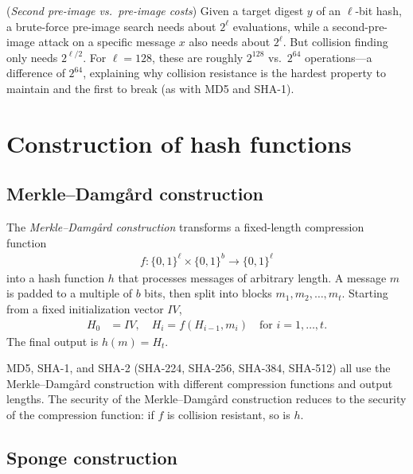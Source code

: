 \documentclass[a4paper, 12pt]{book} %
\begin{document}
\begin{example}
    (\emph{Second pre-image vs.\ pre-image costs}) Given a target digest $y$ of an $\ell$-bit hash, a brute-force pre-image search needs about $2^\ell$ evaluations, while a second-pre-image attack on a specific message $x$ also needs about $2^\ell$. But collision finding only needs $2^{\ell/2}$. For $\ell = 128$, these are roughly $2^{128}$ vs.\ $2^{64}$ operations---a difference of $2^{64}$, explaining why collision resistance is the hardest property to maintain and the first to break (as with MD5 and SHA-1).
\end{example}

\section{Construction of hash functions}

\subsection{Merkle--Damg\aa rd construction}

\begin{definition}
    The \emph{Merkle--Damg\aa rd construction} transforms a fixed-length compression function
    \begin{align}
        f: \{0,1\}^\ell \times \{0,1\}^b \longrightarrow \{0,1\}^\ell
    \end{align}
    into a hash function $h$ that processes messages of arbitrary length. A message $m$ is padded to a multiple of $b$ bits, then split into blocks $m_1, m_2, \ldots, m_t$. Starting from a fixed initialization vector $IV$,
    \begin{align}
        H_0 &= IV, \quad H_i = f(H_{i-1}, m_i) \quad \text{for } i = 1, \ldots, t.
    \end{align}
    The final output is $h(m) = H_t$.
\end{definition}

MD5, SHA-1, and SHA-2 (SHA-224, SHA-256, SHA-384, SHA-512) all use the Merkle--Damg\aa rd construction with different compression functions and output lengths. The security of the Merkle--Damg\aa rd construction reduces to the security of the compression function: if $f$ is collision resistant, so is $h$.

\subsection{Sponge construction}
\end{document}
